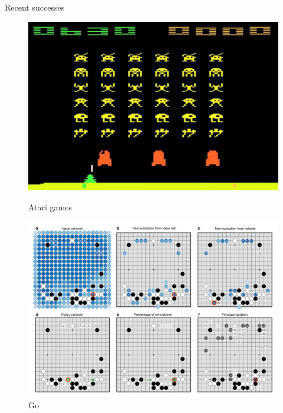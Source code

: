 \documentclass{beamer}
\begin{document}

\begin{frame}{Recent successes}
\begin{figure}
    \centering
    \begin{minipage}{0.45\textwidth}
        \centering
        \includegraphics[width=0.87\linewidth]{gfx/space_invaders.jpg}
        \caption{Atari games}
    \end{minipage}\hfill
    \begin{minipage}{0.45\textwidth}
        \centering
        \includegraphics[width=\linewidth]{gfx/alphago.jpg}
        \caption{Go}
    \end{minipage}
\end{figure}

\end{frame}

\end{document}
